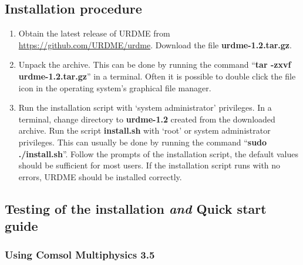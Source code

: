 \subsection{Installation procedure}

\begin{enumerate}
\item Obtain the latest release of URDME from
  \url{https://github.com/URDME/urdme}. Download the file {\bf urdme-1.2.tar.gz}. 
\item Unpack the archive. This can be done by running the command
  ``{\bf tar -zxvf urdme-1.2.tar.gz}'' in a terminal. Often it is
  possible to double click the file icon in the operating system's
  graphical file manager.
\item Run the installation script with `system administrator'
  privileges. In a terminal, change directory to {\bf urdme-1.2}
  created from the downloaded archive. Run the script {\bf install.sh}
  with `root' or system administrator privileges. This can usually be
  done by running the command ``{\bf sudo ./install.sh}''. Follow the
  prompts of the installation script, the default values should be
  sufficient for most users. If the installation script runs with no
  errors, URDME should be installed correctly.
\end{enumerate}

\subsection{Testing of the installation {\it and} Quick start guide}
\label{sec:quickstart}

\subsubsection{Using Comsol Multiphysics 3.5}

